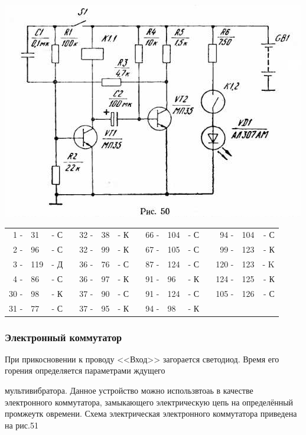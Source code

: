 \documentclass[12pt]{article}
\begin{document}
\hspace*{0.7cm}\includegraphics[scale=0.9, angle=0]{ekon3_050_1}

\hrulefill

\begin{tabular}{r l r p{0.5cm} r l r p{0.5cm} r l r p{0.5cm} r l r}
 1 - &  31 & - С &   & 32 - & 38 & - К &   & 66 - & 104 & - С &   &  94 - & 104  & - С\\
 2 - &  96 & - С &   & 32 - & 99 & - К &   & 67 - & 105 & - С &   &  99 - & 123  & - К\\
 3 - & 119 & - Д &   & 36 - & 76 & - С &   & 87 - & 124 & - С &   & 120 - & 123  & - K\\
 4 - &  86 & - С &   & 36 - & 97 & - К &   & 91 - &  96 & - К &   & 124 - & 125  & - К\\
30 - &  98 & - К &   & 37 - & 90 & - С &   & 91 - & 124 & - С &   & 105 - & 126  & - С\\
31 - &  77 & - С &   & 37 - & 95 & - К &   & 94 - &  98 & - К &   &       &      &    \\
\end{tabular}

\hrulefill

\subsubsection{Электронный коммутатор}
При прикосновении к проводу <<Вход>> загорается светодиод. Время его горения определяется параметрами ждущего 

\newpage

мультивибратора. Данное устройство можно использвтоаь в качестве электронного коммутатора, замыкающего электрическую цепь на определённый промжеутк овремени. Схема электрическая электронного коммутатора приведена на рис.51
\end{document}
